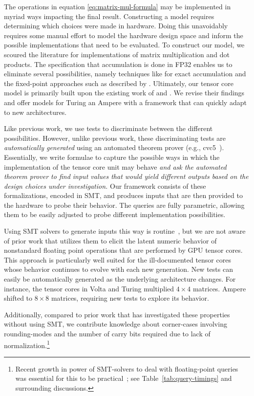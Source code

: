 The operations in equation \ref{eq:matrix-mul-formula} may be implemented in myriad ways impacting the final result. Constructing a model requires determining which choices were made in hardware. Doing this unavoidably requires some manual effort to model the hardware design space and inform the possible implementations that need to be evaluated.  To construct our model, we scoured the literature for implementations of matrix multiplication and dot products.  The specification that accumulation is done in FP32 enables us to eliminate several possibilities, namely techniques like \citet{bohlender2012fast} for exact accumulation and the fixed-point approaches such as described by \citet{boldo:hal-02982017}. Ultimately, our tensor core model is primarily built upon the existing work of \citet{fasi2021numerical} and \citet{Hickmann2019ExperimentalAO}. We revise their findings and offer models for Turing an Ampere with a framework that can quickly adapt to new architectures. 

Like previous work, we use tests to discriminate between the different possibilities.
However, unlike previous work, these discriminating tests are {\em automatically generated}
using an automated theorem prover (e.g., cvc5~\cite{cvc5}).
Essentially, we write formulae to capture the possible ways in which the implementation of the tensor core unit may behave {\em and ask the automated theorem prover to find input values that would yield different outputs based on the design choices under investigation.} Our framework consists of these formalizations, encoded in SMT, and produces inputs that are then provided to the hardware to probe their behavior. The queries are fully parametric, allowing them to be easily adjusted to probe different implementation possibilities.


Using SMT solvers to generate inputs this way is routine~\cite{peleska2011automated,kim2019test}, but we are not aware of prior work that utilizes them to elicit the latent numeric behavior of nonstandard floating point operations that are performed by GPU tensor cores.  This approach is particularly well suited for the ill-documented tensor cores whose behavior continues to evolve with each new generation. New tests can easily be automatically generated as the underlying architecture changes. For instance, the tensor cores in Volta and Turing multiplied $4\times4$ matrices. Ampere shifted to $8\times8$ matrices, requiring new tests to explore its behavior. 

Additionally, compared to prior work that has investigated these properties without using SMT, we contribute knowledge about corner-cases involving rounding-modes and the number of carry bits required due to lack of normalization.\footnote{Recent growth
in power of SMT-solvers to deal with floating-point queries was essential for this to be practical~\cite{brain_building_2019}; see Table~\ref{tab:query-timings} and surrounding discussions.}


